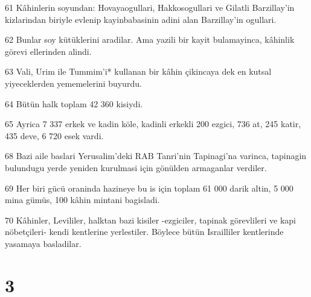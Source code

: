 \par 61 Kâhinlerin soyundan: Hovayaogullari, Hakkosogullari ve Gilatli Barzillay'in kizlarindan biriyle evlenip kayinbabasinin adini alan Barzillay'in ogullari.
\par 62 Bunlar soy kütüklerini aradilar. Ama yazili bir kayit bulamayinca, kâhinlik görevi ellerinden alindi.
\par 63 Vali, Urim ile Tummim'i* kullanan bir kâhin çikincaya dek en kutsal yiyeceklerden yememelerini buyurdu.
\par 64 Bütün halk toplam 42 360 kisiydi.
\par 65 Ayrica 7 337 erkek ve kadin köle, kadinli erkekli 200 ezgici, 736 at, 245 katir, 435 deve, 6 720 esek vardi.
\par 68 Bazi aile baslari Yerusalim'deki RAB Tanri'nin Tapinagi'na varinca, tapinagin bulundugu yerde yeniden kurulmasi için gönülden armaganlar verdiler.
\par 69 Her biri gücü oraninda hazineye bu is için toplam 61 000 darik altin, 5 000 mina gümüs, 100 kâhin mintani bagisladi.
\par 70 Kâhinler, Levililer, halktan bazi kisiler -ezgiciler, tapinak görevlileri ve kapi nöbetçileri- kendi kentlerine yerlestiler. Böylece bütün Israilliler kentlerinde yasamaya basladilar.

\chapter{3}

